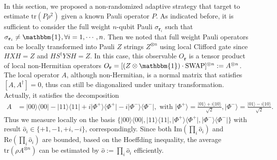 \documentclass[aps,%
twocolumn,%
floatfix,%
pra,%
amsfonts,%
groupedaddress,%
superscriptaddress]{revtex4-2}%
\newcommand{\bra}[1]{\langle #1\rvert}
\newcommand{\ket}[1]{\lvert #1\rangle}
\newcommand{\1}{\mathbbm{1}}
\begin{document}
In this section, we proposed a non-randomized adaptive strategy that target to estimate $\mathrm{tr}(P \rho^2)$ given a known Pauli operator $P$.
As indicated before, it is sufficient to consider the full weight $n$-qubit Pauli $\sigma_{\mathbf{r}_i}$ such that $\sigma_{\mathbf{r}_i} \neq \1,\forall i= 1,\cdots, n$.
Then we noted that full weight Pauli operators can be locally transformed into Pauli $Z$ strings $Z^{\otimes n}$ using local Clifford gate since $HXH = Z$ and $HS^{\dagger}YSH = Z$. 
In this case, this observable $O_{\mathbf{r}}$ is a tensor product of local non-Hermitian operators $O_{\mathbf{r}} = [(Z \otimes \1) \cdot \mathrm{SWAP}]^{\otimes n}:= A^{\otimes n}$. The local operator $A$, although non-Hermitian, is a normal matrix that satisfies $[A,A^\dagger] = 0$, thus can still be diagonalized under unitary transformation. Actually, it satisfies the decomposition
\begin{align}
    A &= \ket{00}\!\bra{00} - \ket{11}\!\bra{11} + i\ket{\Phi^+}\!\bra{\Phi^+} - i \ket{\Phi^-}\!\bra{\Phi^-}, \text{~with~} \ket{\Phi^+} = \frac{\ket{01} + i \ket{10}}{\sqrt{2}}, \ket{\Phi^-} = \frac{\ket{01} - i \ket{10}}{\sqrt{2}}. 
\end{align}
Thus we measure locally on the basis $\{\ket{00}\!\bra{00}, \ket{11}\!\bra{11}, \ket{\Phi^+}\!\bra{\Phi^+},\ket{\Phi^-}\!\bra{\Phi^-}\}$ with result $\hat{o}_i \in \{+1,-1,+i,-i\}$, correspondingly. 
Since both $\mathrm{Im}(\prod_{i} \hat{o}_i)$ and $\mathrm{Re}(\prod_{i} \hat{o}_i)$ are bounded, based on the Hoeffding inequality, the average $\mathrm{tr}(\rho A^{\otimes n})$ can be estimated by $\hat{o}:=\prod_{i}\hat{o}_i$ efficiently.
\end{document}
